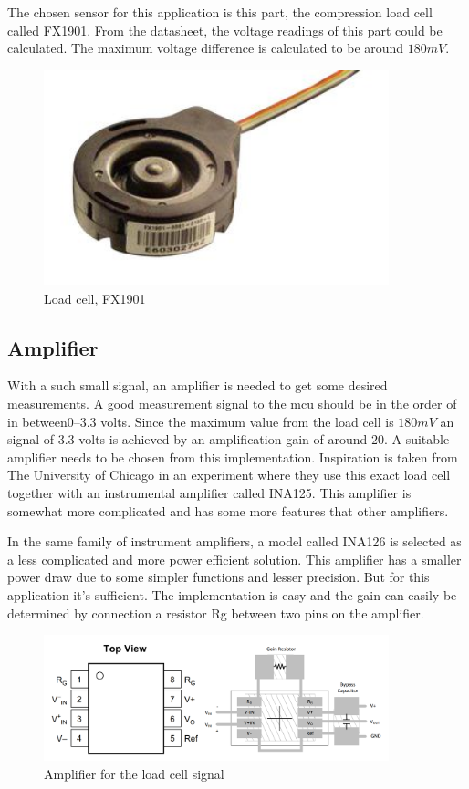 The chosen sensor for this application is this part, the compression load cell called FX1901\cite{load_cell}.  
From the datasheet, the voltage readings of this part could be calculated. The maximum voltage difference is calculated to be around $180mV$. 

\begin{figure}[H]
\begin{center}
	\includegraphics[width = 10cm]{Figures/Load_cell.png}
	\caption{Load cell, FX1901}
	\label{Load_cell}
\end{center}
\end{figure}


\subsection{Amplifier}
With a such small signal, an amplifier is needed to get some desired measurements. A good measurement signal to the \gls{mcu} should be in the order of in between$0–3.3$ volts. Since the maximum value from the load cell is $180mV$ an signal of $3.3$ volts is achieved by an amplification gain of around $20$.  
A suitable amplifier needs to be chosen from this implementation. Inspiration is taken from The University of Chicago\cite{UoC} in an experiment where they use this exact load cell together with an instrumental amplifier called INA125. This amplifier is somewhat more complicated and has some more features that other amplifiers.  

In the same family of instrument amplifiers, a model called INA126\cite{ina_126} is selected as a less complicated and more power efficient solution.  
This amplifier has a smaller power draw due to some simpler functions and lesser precision. But for this application it's sufficient.  
The implementation is easy and the gain can easily be determined by connection a resistor Rg between two pins on the amplifier. 

\begin{figure}[H]
\begin{center}
	\includegraphics[width = 10cm]{Figures/INA126_pinout.png}
	\caption{Amplifier for the load cell signal}
	\label{INA126}
\end{center}
\end{figure}

